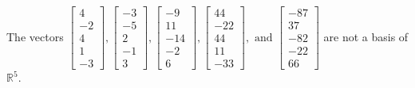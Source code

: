\begin{exercise}
\begin{exerciseStatement}
  \end{exerciseStatement}
  \begin{exerciseAnswer}
   The vectors \(\left[\begin{array}{r}
4 \\
-2 \\
4 \\
1 \\
-3
\end{array}\right] , \left[\begin{array}{r}
-3 \\
-5 \\
2 \\
-1 \\
3
\end{array}\right] , \left[\begin{array}{r}
-9 \\
11 \\
-14 \\
-2 \\
6
\end{array}\right] , \left[\begin{array}{r}
44 \\
-22 \\
44 \\
11 \\
-33
\end{array}\right] , \text{ and } \left[\begin{array}{r}
-87 \\
37 \\
-82 \\
-22 \\
66
\end{array}\right]\) 
  	 are not  a basis of \(\mathbb{R}^5\).
  


  \end{exerciseAnswer}
\end{exercise}